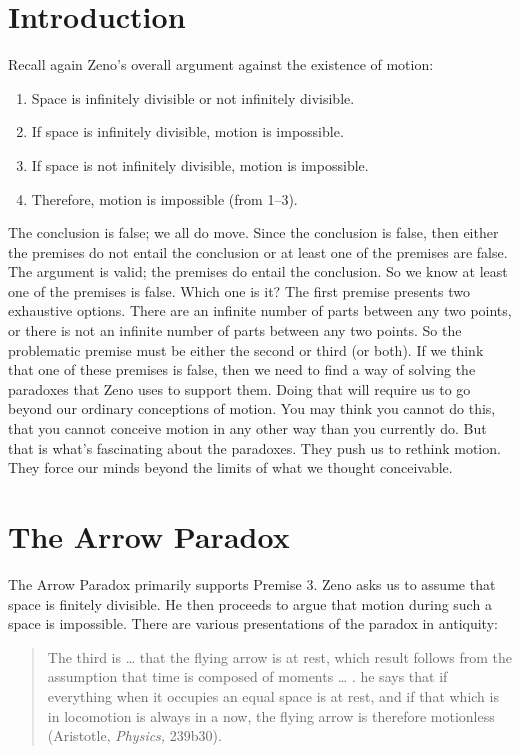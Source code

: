 \documentclass[oneside]{article}
\begin{document}
\thispagestyle{fancy}



\section*{Introduction}

Recall again Zeno's overall argument against the existence of motion:

\begin{enumerate}
\item Space is infinitely divisible or not infinitely divisible.
\item  If space is infinitely divisible, motion is impossible.
\item  If space is not infinitely divisible, motion is impossible.
\item  Therefore, motion is impossible (from 1--3).
\end{enumerate}
The conclusion is false; we all do move. Since the conclusion is false, then either the premises do not entail the conclusion or at least one of the premises are false. The argument is valid; the premises do entail the conclusion. So we know at least one of the premises is false. Which one is it? The first premise presents two exhaustive options. There are an infinite number of parts between any two points, or there is not an infinite number of parts between any two points. So the problematic premise must be either the second or third (or both). If we think that one of these premises is false, then we need to find a way of solving the paradoxes that Zeno uses to support them. Doing that will require us to go beyond our ordinary conceptions of motion. You may think you cannot do this, that you cannot conceive motion in any other way than you currently do. But that is what's fascinating about the paradoxes. They push us to rethink motion. They force our minds beyond the limits of what we thought conceivable. 

\section*{The Arrow Paradox}\label{the-arrow-paradox}
The Arrow Paradox primarily supports Premise 3. Zeno asks us to assume that space is finitely divisible. He then proceeds to argue that motion during such  a space is impossible.  There are various presentations of the paradox in antiquity: 
\begin{quote}
The third is \ldots{} that the flying arrow is at rest, which result
follows from the assumption that time is composed of moments \ldots{} .
he says that if everything when it occupies an equal space is at rest,
and if that which is in locomotion is always in a now, the flying arrow
is therefore motionless (Aristotle, \emph{Physics,} 239b30).
\end{quote}
\end{document}
